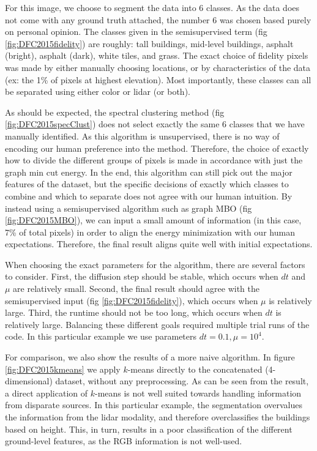 \documentclass[journal]{IEEEtran}
\begin{document}
For this image, we choose to segment the data into 6 classes. As the data does
not come with any ground truth attached, the number 6 was chosen based purely on
personal opinion. The classes given in the semisupervised term (fig
\ref{fig:DFC2015fidelity}) are roughly: tall buildings, mid-level buildings, asphalt
(bright), asphalt (dark), white tiles, and grass. The exact choice of fidelity
pixels was made by either manually choosing locations, or by characteristics of
the data (ex: the 1\% of pixels at highest elevation). Most importantly, these
classes can all be separated using either color or lidar (or both).

As should be expected, the spectral clustering method (fig
\ref{fig:DFC2015specClust}) does not select exactly the same 6 classes that we have manually
identified. As this algorithm is unsupervised, there is no way of encoding our
human preference into the method. Therefore, the choice of exactly how to divide
the different groups of pixels is made in accordance with just the graph min cut
energy. In the end, this algorithm can still pick out the major features of the
dataset, but the specific decisions of exactly which classes to combine and
which to separate does not agree with our human intuition. By instead using a
semisupervised algorithm such as graph MBO (fig \ref{fig:DFC2015MBO}), we can input
a small amount of information (in this case, 7\% of total pixels) in order to
align the energy minimization with our human expectations. Therefore, the final
result aligns quite well with initial expectations.

When choosing the exact parameters for the algorithm, there are several factors
to consider. First, the diffusion step should be stable, which occurs when $dt$
and $\mu$ are relatively small. Second, the final result should agree with the
semisupervised input (fig \ref{fig:DFC2015fidelity}), which occurs when $\mu$ is
relatively large. Third, the runtime should not be too long, which occurs when
$dt$ is relatively large. Balancing these different goals required multiple
trial runs of the code. In this particular example we use parameters
$dt = 0.1, \mu = 10^4$.

For comparison, we also show the results of a more naive algorithm.  In figure
\ref{fig:DFC2015kmeans} we apply $k$-means directly to the concatenated
(4-dimensional) dataset, without any preprocessing. As can be seen from the
result, a direct application of $k$-means is not well suited towards handling
information from disparate sources. In this particular example, the segmentation
overvalues the information from the lidar modality, and therefore overclassifies
the buildings based on height. This, in turn, results in a poor classification
of the different ground-level features, as the RGB information is not well-used.
\end{document}
